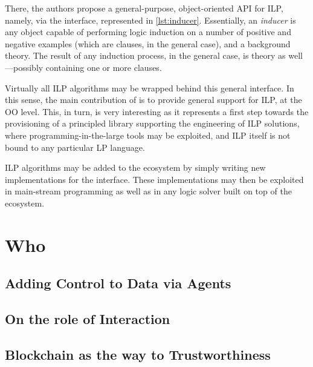 \documentclass[12pt,a4paper,openright,twoside]{book}
\begin{document}


There, the authors propose a general-purpose, object-oriented API for ILP, namely, via the  interface, represented in \cref{lst:inducer}.
%
Essentially, an \emph{inducer} is any object capable of performing logic induction on a number of positive and negative examples (which are clauses, in the general case), and a background theory.
%
The result of any induction process, in the general case, is theory as well---possibly containing one or more clauses.

Virtually all ILP algorithms may be wrapped behind this general interface.
%
In this sense, the main contribution of \cite{Speciale2021} is to provide general support for ILP, at the OO level.
%
This, in turn, is very interesting as it represents a first step towards the provisioning of a principled library supporting the engineering of ILP solutions, where programming-in-the-large tools may be exploited, and ILP itself is not bound to any particular LP language.

ILP algorithms may be added to the ecosystem by simply writing new implementations for the  interface.
%
These implementations may then be exploited in main-stream programming as well as in any logic solver built on top of the \twopkt{} ecosystem.

\part{Who}
\label{part:who}

\cite{imagination-extraamas2021}
\cite{expectation-extraamas2021}

\chapter{Adding Control to Data via Agents}

\chapter{On the role of Interaction}

\cite{tusow-icccn2019}
\cite{respect-idc2017}
\cite{respectx-comsis15}

\chapter{Blockchain as the way to Trustworthiness}
\end{document}
